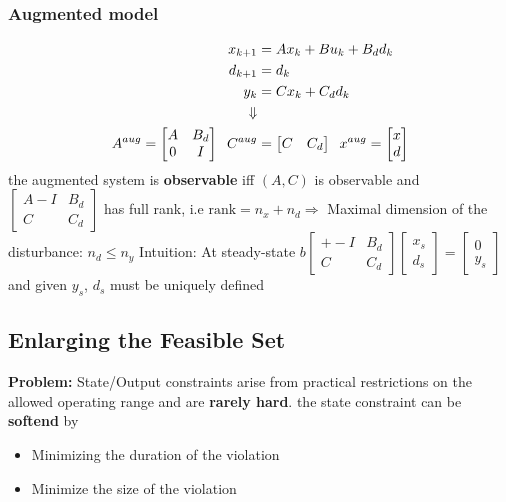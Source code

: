 \subsubsection{Augmented model}
\begin{align*}
    x_{k+1} &= Ax_k + B u_k + B_d d_k\\
    d_{k+1} &= d_k\\
    y_k &= Cx_k + C_dd_k\\ 
    \Downarrow \\
    A^{aug} = \begin{bmatrix} A & B_d \\ 0 & I\end{bmatrix} \hspace{2mm} C^{aug} &= \begin{bmatrix}
        C & C_d
    \end{bmatrix}
    \hspace{2mm} x^{aug} = \begin{bmatrix} x \\ d\end{bmatrix}
\end{align*}
the augmented system is \textbf{observable} iff $(A,C)$ is observable and $\begin{bmatrix} A-I & B_d \\ C & C_d \end{bmatrix}$ has full rank, i.e $\mathrm{rank} = n_x+n_d \Rightarrow$ Maximal dimension of the disturbance: $ n_d \leq  n_y$
Intuition: At steady-state $b\begin{bmatrix} +-I & B_d \\ C & C_d \end{bmatrix} \begin{bmatrix}x_s \\ d_s\end{bmatrix} = \begin{bmatrix}0 \\ y_s \end{bmatrix}$ and given $y_s$, $d_s$ must be uniquely defined
\subsection{Enlarging the Feasible Set}
\textbf{Problem:} State/Output constraints arise from practical restrictions on the allowed operating range and are \textbf{rarely hard}. the state constraint can be \textbf{softend} by 
\begin{itemize}
    \item Minimizing the duration of the violation
    \item Minimize the size of the violation
\end{itemize}
